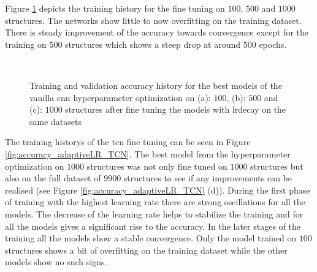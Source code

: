 \documentclass[conference]{IEEEtran}
\begin{document}
Figure \ref{fig:accuracy_adaptiveLR_CNN} depicts the training history for the fine tuning on $ 100 $, $ 500 $ and $ 1000 $ structures. The networks show little to now overfitting on the training dataset. There is steady improvement of the accuracy towards convergence except for the training on $ 500 $ structures which shows a steep drop at around $ 500 $ epochs.

\begin{figure}[htp]
	\centering
	\quad
	\\
	\caption{Training and validation accuracy history for the best models of the vanilla \gls{cnn} hyperparameter optimization on (a): $ 100 $, (b): $ 500 $ and (c): $ 1000 $ structures after fine tuning the models with \gls{lrdecay} on the same datasets}
	\label{fig:accuracy_adaptiveLR_CNN}
\end{figure}

 The training historys of the \gls{tcn} fine tuning can be seen in Figure \ref{fig:accuracy_adaptiveLR_TCN}. The best model from the hyperparameter optimization on $ 1000 $ structures was not only fine tuned on $ 1000 $ structures but also on the full dataset of $ 9900 $ structures to see if any improvements can be realised (see Figure \ref{fig:accuracy_adaptiveLR_TCN} (d)). During the first phase of training with the highest learning rate there are strong oscillations for all the models. The decrease of the learning rate helps to stabilize the training and for all the models gives a significant rise to the accuracy. In the later stages of the training all the models show a stable convergence. Only the model trained on $ 100 $ structures shows a bit of overfitting on the training dataset while the other models show no such signs. 
\end{document}
